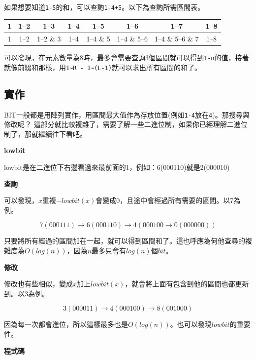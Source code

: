     如果想要知道\verb|1-5|的和，可以查詢\verb|1-4+5|。以下為查詢所需區間表。

    \begin{center}
    \begin{tabular}{|c|c|c|c|c|c|c|c|}
        \hline
        1 & 1--2 & 1--3 & 1--4 & 1--5 & 1--6 & 1--7 & 1--8 \\
        \hline
        1 & 1--2 & 1--2 \& 3 & 1--4 & 1--4 \& 5 & 1--4 \& 5--6 & 1--4 \& 5--6 \& 7 & 1--8 \\
        \hline
    \end{tabular}
    \end{center}

    可以發現，在元素數量為$8$時，最多會需要查詢$3$個區間就可以得到\verb|1-n|的值，接著就像前綴和那樣，用\verb|1~R - 1~(L-1)|就可以求出所有區間的和了。

    \subsection{實作}
    BIT一般都是用陣列實作，用區間最大值作為存放位置(例如\verb|1-4|放在\verb|4|)。那搜尋與修改呢？
    這部分就比較複雜了，需要了解一些二進位制，如果你已經理解二進位制了，那就繼續往下看吧。

    \textbf{lowbit}

    lowbit是在二進位下右邊看過來最前面的1，例如：6(000110)就是2(000010)

    \textbf{查詢}

    可以發現，$x$重複$-lowbit(x)$會變成0，且途中會經過所有需要的區間。以7為例。

    $$7(000111) \to 6(000110) \to 4(000100 \to 0(000000))$$
    
    只要將所有經過的區間加在一起，就可以得到區間和了。這也呼應為何他查尋的複雜度為$O(log(n))$，因為$n$最多只會有$log(n)$個$bit$。

    \textbf{修改}

    修改也有些相似，變成$x$加上$lowbit(x)$，就會將上面有包含到他的區間也都更新到。以$3$為例。

    $$3(000011) \to 4(000100) \to 8(001000)$$

    因為每一次都會進位，所以這樣最多也是$O(log(n))$。也可以發現$lowbit$的重要性。

    \textbf{程式碼}

